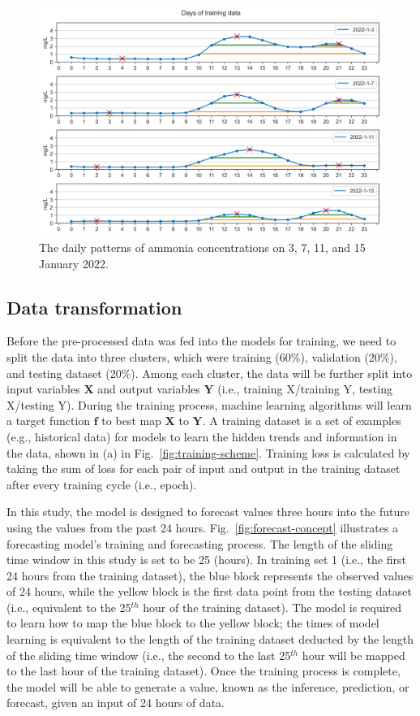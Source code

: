 \begin{figure}[!ht]
  \centering
  \includegraphics[width=0.8\columnwidth]{imgs/results/nh3-pattern.png}
  \caption{The daily patterns of ammonia concentrations on 3, 7, 11, and 15 January 2022.}
  \label{fig:nh3-peak-pattern}
\end{figure}


\subsection{Data transformation}
Before the pre-processed data was fed into the models for training, we need to split the data into three clusters, which were training (60\%), validation (20\%), and testing dataset (20\%). Among each cluster, the data will be further split into input variables $\bm{X}$ and output variables $\bm{Y}$ (i.e., training X/training Y, testing X/testing Y). During the training process, machine learning algorithms will learn a target function $\bm{f}$ to best map $\bm{X}$ to $\bm{Y}$. A training dataset is a set of examples (e.g., historical data) for models to learn the hidden trends and information in the data, shown in (a) in Fig.~\ref{fig:training-scheme}. Training loss is calculated by taking the sum of loss for each pair of input and output in the training dataset after every training cycle (i.e., epoch).

In this study, the model is designed to forecast values three hours into the future using the values from the past 24 hours. Fig.~\ref{fig:forecast-concept} illustrates a forecasting model's training and forecasting process. The length of the sliding time window in this study is set to be 25 (hours). In training set 1 (i.e., the first 24 hours from the training dataset), the blue block represents the observed values of 24 hours, while the yellow block is the first data point from the testing dataset (i.e., equivalent to the 25$^{th}$ hour of the training dataset). The model is required to learn how to map the blue block to the yellow block; the times of model learning is equivalent to the length of the training dataset deducted by the length of the sliding time window (i.e., the second to the last 25$^{th}$ hour will be mapped to the last hour of the training dataset). Once the training process is complete, the model will be able to generate a value, known as the inference, prediction, or forecast, given an input of 24 hours of data. 

